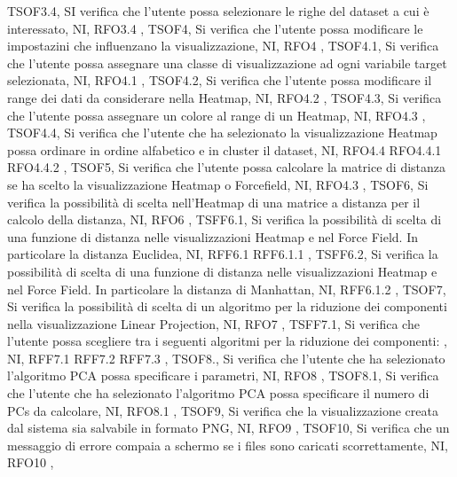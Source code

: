 {    {   
        TSOF3.4,
        SI verifica che l'utente possa selezionare le righe del dataset a cui è interessato,
        NI,
        RFO3.4
    },
    {   
        TSOF4,
        Si verifica che l'utente possa modificare le impostazini che influenzano la visualizzazione,
        NI,
        RFO4
    },
    {   
        TSOF4.1,
        Si verifica che l'utente possa assegnare una classe di visualizzazione ad ogni variabile target selezionata,
        NI,
        RFO4.1
    },
    {   
        TSOF4.2,
        Si verifica che l'utente possa modificare il range dei dati da considerare nella Heatmap,
        NI,
        RFO4.2
    },
    {   
        TSOF4.3,
        Si verifica che l'utente possa assegnare un colore al range di un Heatmap,
        NI,
        RFO4.3
    },
    {   
        TSOF4.4,
        Si verifica che l'utente che ha selezionato la visualizzazione Heatmap possa ordinare in ordine alfabetico e in cluster il dataset,
        NI,
        RFO4.4 RFO4.4.1 RFO4.4.2
    },
    {   
        TSOF5,
        Si verifica che l'utente possa calcolare la matrice di distanza se ha scelto la visualizzazione Heatmap o Forcefield,
        NI,
        RFO4.3
    },    
    {   
        TSOF6,
        Si verifica la possibilità di scelta nell'Heatmap di una matrice a distanza per il calcolo della distanza,
        NI,
        RFO6
    },
    {   
        TSFF6.1,
        Si verifica la possibilità di scelta di una funzione di distanza nelle visualizzazioni Heatmap e nel Force Field. In particolare la distanza Euclidea,
        NI,
        RFF6.1 RFF6.1.1
    },
    {   
        TSFF6.2,
        Si verifica la possibilità di scelta di una funzione di distanza nelle visualizzazioni Heatmap e nel Force Field. In particolare la distanza di Manhattan,
        NI,
        RFF6.1.2
    },
    {   
        TSOF7,
        Si verifica la possibilità di scelta di un algoritmo per la riduzione dei componenti nella visualizzazione Linear Projection,
        NI,
        RFO7
    },
    {   
        TSFF7.1,
        Si verifica che l'utente possa scegliere tra i seguenti algoritmi per la riduzione dei componenti:
        ,
        NI,
        RFF7.1 RFF7.2 RFF7.3
    },
    {   
        TSOF8.,
        Si verifica che l'utente che ha selezionato l'algoritmo PCA possa specificare i parametri,
        NI,
        RFO8
    },
    {   
        TSOF8.1,
        Si verifica che l'utente che ha selezionato l'algoritmo PCA possa specificare il numero di PCs da calcolare,
        NI,
        RFO8.1
    },
    {   
        TSOF9,
        Si verifica che la visualizzazione creata dal sistema sia salvabile in formato PNG,
        NI,
        RFO9
    },
    {   
        TSOF10,
        Si verifica che un messaggio di errore compaia a schermo se i files sono caricati scorrettamente,
        NI,
        RFO10
    },
    }
    
    
